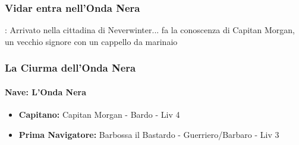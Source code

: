 \documentclass{article}
\begin{document}
\subsubsection{Vidar entra nell'Onda Nera}: 
Arrivato nella cittadina di Neverwinter... fa la conoscenza di Capitan Morgan, un vecchio signore con un cappello da marinaio


\subsubsection*{La Ciurma dell'Onda Nera}

\paragraph*{Nave: L'Onda Nera}

\begin{itemize}
  \item \textbf{Capitano:} Capitan Morgan - Bardo - Liv 4
  \item \textbf{Prima Navigatore:} Barbossa il Bastardo - Guerriero/Barbaro - Liv 3
\end{itemize}
\end{document}
